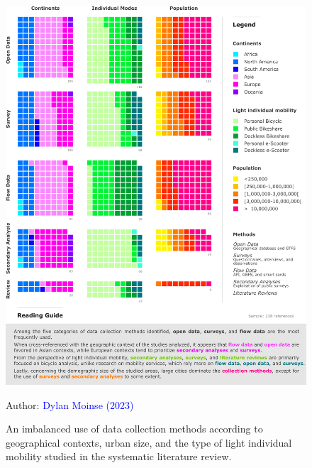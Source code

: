 \begin{refsegment}
\begin{figure}[h!]\vspace*{4pt}
    \caption{An imbalanced use of data collection methods according to geographical contexts, urban size, and the type of light individual mobility studied in the systematic literature review.}
    \label{fig-chap2:sources-donnees-rsl}
    \centerline{\includegraphics[width=1\columnwidth]{src/Figures/Chap-2/EN_RSL_Sources_donnees.pdf}}
    \vspace{5pt}
    \begin{flushright}\scriptsize{
    Author: \textcolor{blue}{Dylan Moinse (2023)}
    }\end{flushright}
\end{figure}


\end{refsegment}
